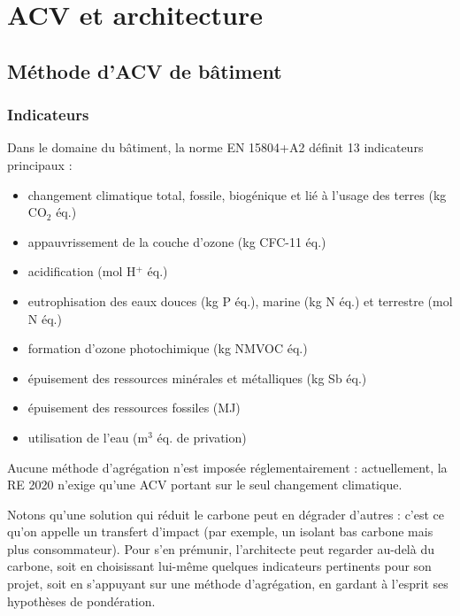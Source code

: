\part{ACV et architecture}

\chapter{Méthode d'ACV de bâtiment}
\label{chap:methode-batiment}
\section{Indicateurs}

Dans le domaine du bâtiment, la norme EN 15804+A2 définit 13 indicateurs principaux :
\begin{itemize}
  \item changement climatique total, fossile, biogénique et lié à l'usage des terres (kg CO$_2$ éq.)
  \item appauvrissement de la couche d'ozone (kg CFC-11 éq.)
  \item acidification (mol H$^+$ éq.)
  \item eutrophisation des eaux douces (kg P éq.), marine (kg N éq.) et terrestre (mol N éq.)
  \item formation d'ozone photochimique (kg NMVOC éq.)
  \item épuisement des ressources minérales et métalliques (kg Sb éq.)
  \item épuisement des ressources fossiles (MJ)
  \item utilisation de l'eau (m$^3$ éq. de privation)
\end{itemize}

Aucune méthode d’agrégation n’est imposée réglementairement : actuellement, la RE 2020 n’exige qu’une ACV portant sur le seul changement climatique.

Notons qu'une solution qui réduit le carbone peut en dégrader d’autres : c’est ce qu’on appelle un transfert d’impact (par exemple, un isolant bas carbone mais plus consommateur). Pour s’en prémunir, l’architecte peut regarder au-delà du carbone, soit en choisissant lui-même quelques indicateurs pertinents pour son projet, soit en s’appuyant sur une méthode d’agrégation, en gardant à l’esprit ses hypothèses de pondération.

